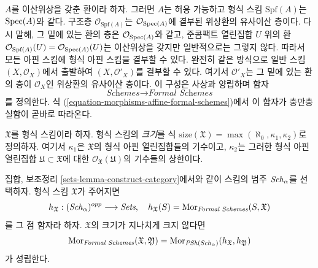 \medskip\noindent
$A$를 이산위상을 갖춘 환이라 하자. 그러면 $A$는 허용 가능하고
형식 스킴 $\text{Spf}(A)$는 $\mathop{\mathrm{Spec}}(A)$와 같다. 구조층
$\mathcal{O}_{\text{Spf}(A)}$는 $\mathcal{O}_{\mathop{\mathrm{Spec}}(A)}$에 결부된
위상환의 유사이산 층이다. 다시 말해, 그 밑에 있는 환의 층은
$\mathcal{O}_{\mathop{\mathrm{Spec}}(A)}$와 같고, 준콤팩트 열린집합 $U$ 위의 환
$\mathcal{O}_{\text{Spf}(A)}(U) = \mathcal{O}_{\mathop{\mathrm{Spec}}(A)}(U)$는
이산위상을 갖지만 일반적으로는 그렇지 않다. 따라서 모든 아핀 스킴에
형식 아핀 스킴을 결부할 수 있다. 완전히 같은 방식으로 일반 스킴
$(X, \mathcal{O}_X)$에서 출발하여 $(X, \mathcal{O}'_X)$를 결부할 수
있다. 여기서 $\mathcal{O}'_X$는 그 밑에 있는 환의 층이
$\mathcal{O}_X$인 위상환의 유사이산 층이다. 이 구성은 사상과
양립하며 함자
\begin{equation}
\label{equation-compare-schemes-formal-schemes}
\textit{Schemes} \longrightarrow \textit{Formal Schemes}
\end{equation}
를 정의한다. 식 (\ref{equation-morphisms-affine-formal-schemes})에서
이 함자가 충만충실함이 곧바로 따라온다.

\medskip\noindent
$\mathfrak X$를 형식 스킴이라 하자. 형식 스킴의 {\it 크기}를 식
$\text{size}(\mathfrak X) = \max(\aleph_0, \kappa_1, \kappa_2)$로
정의하자. 여기서 $\kappa_1$은 $\mathfrak X$의 형식 아핀
열린집합들의 기수이고, $\kappa_2$는 그러한 형식 아핀 열린집합
$\mathfrak U \subset \mathfrak X$에 대한
$\mathcal{O}_\mathfrak X(\mathfrak U)$의 기수들의 상한이다.

\begin{lemma}
\label{lemma-fully-faithful}
집합, 보조정리 \ref{sets-lemma-construct-category}에서와 같이 스킴의
범주 $\mathit{Sch}_\alpha$를 선택하자. 형식 스킴 $\mathfrak X$가 주어지면
$$
h_\mathfrak X : (\mathit{Sch}_\alpha)^{opp} \longrightarrow \textit{Sets},\quad
h_\mathfrak X(S) = \mathop{\mathrm{Mor}}\nolimits_{\textit{Formal Schemes}}(S, \mathfrak X)
$$
를 그 점 함자라 하자. $\mathfrak X$의 크기가 지나치게 크지 않다면
$$
\mathop{\mathrm{Mor}}\nolimits_{\textit{Formal Schemes}}(\mathfrak X, \mathfrak Y) =
\mathop{\mathrm{Mor}}\nolimits_{\textit{PSh}(\mathit{Sch}_\alpha)}(h_\mathfrak X, h_\mathfrak Y)
$$
가 성립한다.
\end{lemma}

